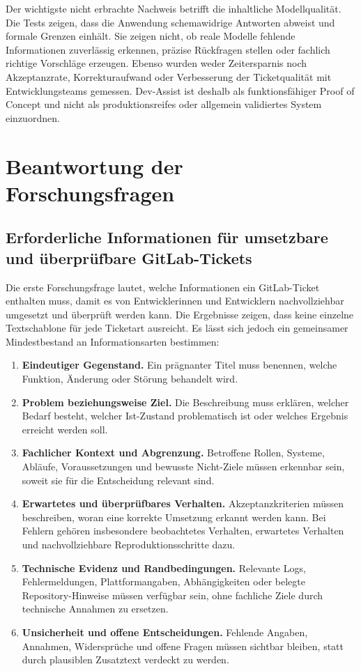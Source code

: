 Der wichtigste nicht erbrachte Nachweis betrifft die inhaltliche Modellqualität. Die Tests zeigen, dass die Anwendung schemawidrige Antworten abweist und formale Grenzen einhält. Sie zeigen nicht, ob reale Modelle fehlende Informationen zuverlässig erkennen, präzise Rückfragen stellen oder fachlich richtige Vorschläge erzeugen. Ebenso wurden weder Zeitersparnis noch Akzeptanzrate, Korrekturaufwand oder Verbesserung der Ticketqualität mit Entwicklungsteams gemessen. Dev-Assist ist deshalb als funktionsfähiger Proof of Concept und nicht als produktionsreifes oder allgemein validiertes System einzuordnen.

\section{Beantwortung der Forschungsfragen}

\subsection{Erforderliche Informationen für umsetzbare und überprüfbare GitLab-Tickets}

Die erste Forschungsfrage lautet, welche Informationen ein GitLab-Ticket enthalten muss, damit es von Entwicklerinnen und Entwicklern nachvollziehbar umgesetzt und überprüft werden kann. Die Ergebnisse zeigen, dass keine einzelne Textschablone für jede Ticketart ausreicht. Es lässt sich jedoch ein gemeinsamer Mindestbestand an Informationsarten bestimmen:

\begin{enumerate}[leftmargin=1.2cm]
\item \textbf{Eindeutiger Gegenstand.} Ein prägnanter Titel muss benennen, welche Funktion, Änderung oder Störung behandelt wird.
\item \textbf{Problem beziehungsweise Ziel.} Die Beschreibung muss erklären, welcher Bedarf besteht, welcher Ist-Zustand problematisch ist oder welches Ergebnis erreicht werden soll.
\item \textbf{Fachlicher Kontext und Abgrenzung.} Betroffene Rollen, Systeme, Abläufe, Voraussetzungen und bewusste Nicht-Ziele müssen erkennbar sein, soweit sie für die Entscheidung relevant sind.
\item \textbf{Erwartetes und überprüfbares Verhalten.} Akzeptanzkriterien müssen beschreiben, woran eine korrekte Umsetzung erkannt werden kann. Bei Fehlern gehören insbesondere beobachtetes Verhalten, erwartetes Verhalten und nachvollziehbare Reproduktionsschritte dazu.
\item \textbf{Technische Evidenz und Randbedingungen.} Relevante Logs, Fehlermeldungen, Plattformangaben, Abhängigkeiten oder belegte Repository-Hinweise müssen verfügbar sein, ohne fachliche Ziele durch technische Annahmen zu ersetzen.
\item \textbf{Unsicherheit und offene Entscheidungen.} Fehlende Angaben, Annahmen, Widersprüche und offene Fragen müssen sichtbar bleiben, statt durch plausiblen Zusatztext verdeckt zu werden.
\end{enumerate}

